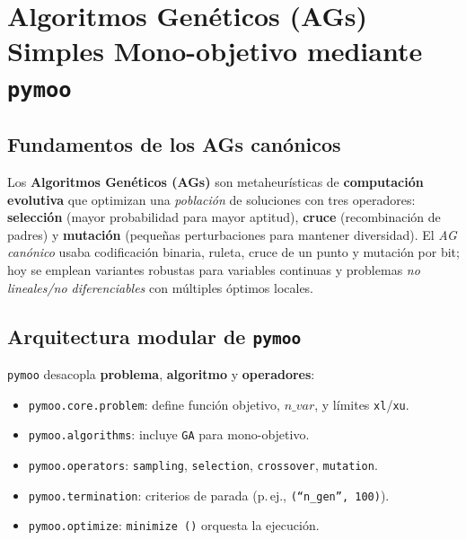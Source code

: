 \section{Algoritmos Genéticos (AGs) Simples Mono-objetivo mediante \texttt{pymoo}}
\label{sec:ags_simples_pymoo}%

\subsection{Fundamentos de los AGs canónicos}
\label{subsec:fundamentos_ags}%
Los \textbf{Algoritmos Genéticos (AGs)} son metaheurísticas de \textbf{computación evolutiva} que optimizan una \emph{población} de soluciones con tres operadores: \textbf{selección} (mayor probabilidad para mayor aptitud), \textbf{cruce} (recombinación de padres) y \textbf{mutación} (pequeñas perturbaciones para mantener diversidad). El \emph{AG canónico} usaba codificación binaria, ruleta, cruce de un punto y mutación por bit; hoy se emplean variantes robustas para variables continuas y problemas \emph{no lineales/no diferenciables} con múltiples óptimos locales.

\subsection{Arquitectura modular de \texttt{pymoo}}%
\label{subsec:arquitectura_pymoo}
\texttt{pymoo} desacopla \textbf{problema}, \textbf{algoritmo} y \textbf{operadores}:
\begin{itemize}
  \item \texttt{pymoo.core.problem}: define función objetivo, $n\_var$, y límites \texttt{xl}/\texttt{xu}.
  \item \texttt{pymoo.algorithms}: incluye \texttt{GA} para mono-objetivo.
  \item \texttt{pymoo.operators}: \texttt{sampling}, \texttt{selection}, \texttt{crossover}, \texttt{mutation}.
  \item \texttt{pymoo.termination}: criterios de parada (p.\,ej., \texttt{(``n\_gen'', 100)}).
  \item \texttt{pymoo.optimize}: \texttt{minimize~()} orquesta la ejecución.
\end{itemize}

